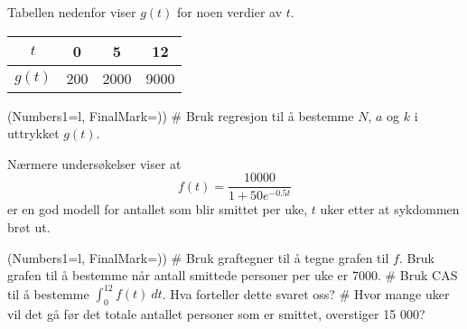 Tabellen nedenfor viser $g(t)$ for noen verdier av $t$.
\begin{center}
	\begin{tabular}{|c|c|c|c|}
		\hline 
		$t$ & 0 & 5 & 12 \\ \hline
		$g(t)$ & 200 & 2000 & 9000 \\ \hline
	\end{tabular}
\end{center}

\begin{easylist}[enumerate]
	\ListProperties(Numbers1=l, FinalMark={)})
	# Bruk regresjon til å bestemme $N$, $a$ og $k$ i uttrykket
	$g(t)$.
\end{easylist}
Nærmere undersøkelser viser at
\begin{equation*}
f(t) = \frac{10000}{1 + 50e^{-0.5t}}
\end{equation*}
er en god modell for antallet som blir smittet per uke, $t$
uker etter at sykdommen brøt ut.
\begin{easylist}
	\ListProperties(Numbers1=l, FinalMark={)})
	# Bruk graftegner til å tegne grafen til $f$.
	Bruk grafen til å bestemme når antall smittede
	personer per uke er 7000.
	# Bruk CAS til å bestemme $\int_{0}^{12} f(t) \ dt$.
	Hva forteller dette svaret oss?
	# Hvor mange uker vil det gå før det totale antallet 
	personer som er smittet, overstiger 15 000?
\end{easylist}
\vfill
